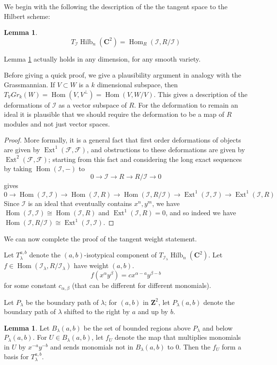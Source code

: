 \documentclass{amsart}[12pt]
\theoremstyle{definition}
\newtheorem{lemma}[dummy]{Lemma}
\newcommand{\Z}{\mathbf{Z}}
\newcommand{\C}{\mathbf{C}}
\DeclareMathOperator{\Hilb}{Hilb}
\DeclareMathOperator{\Ext}{Ext}
\DeclareMathOperator{\Hom}{Hom}
\begin{document}
We begin with the following the description of the the tangent space to the Hilbert scheme:


\begin{lemma} \label{lem:tangent-hom}
$$T_{\mathcal{I}}\Hilb_n(\C^2)=\Hom_R(\mathcal{I},R/\mathcal{I})$$
\end{lemma}

Lemma \ref{lem:tangent-hom} actually holds in any dimension, for any smooth variety.

Before giving a quick proof, we give a plausibility argument in analogy with the Grassmannian.  If $V\subset W$ is a $k$ dimensional subspace, then $T_V Gr_k(W)=\Hom(V, V^\perp)=\Hom(V, W/V)$.  This gives a description of the deformations of $\mathcal{I}$ as a vector subspace of $R$.  For the deformation to remain an ideal it is plausible that we should require the deformation to be a map of $R$ modules and not just vector spaces.

\begin{proof}
More formally, it is a general fact that first order deformations of objects are given by $\Ext^1(\mathcal{F},\mathcal{F})$, and obstructions to these deformations are given by $\Ext^2(\mathcal{F},\mathcal{F})$; starting from this fact and considering the long exact sequences by taking $\Hom(\mathcal{I}, -)$ to
$$0\to \mathcal{I}\to R\to R/\mathcal{I}\to 0$$
gives 
$$0\to\Hom(\mathcal{I},\mathcal{I})\to \Hom(\mathcal{I}, R)\to\Hom(\mathcal{I},R/\mathcal{I})\to\Ext^1(\mathcal{I}, \mathcal{I})\to\Ext^1(\mathcal{I},R)$$
Since $\mathcal{I}$ is an ideal that eventually contains $x^n, y^m$, we have $\Hom(\mathcal{I},\mathcal{I})\cong\Hom(\mathcal{I}, R)$ and $\Ext^1(\mathcal{I},R)=0$, and so indeed we have $\Hom(\mathcal{I},R/\mathcal{I})\cong\Ext^1(\mathcal{I}, \mathcal{I})$.
\end{proof}

We can now complete the proof of the tangent weight statement.


Let $T_\lambda^{a,b}$ denote the $(a,b)$-isotypical component of $T_{\mathcal{I}_\lambda}\Hilb_n(\C^2)$.  Let $f\in\Hom(\mathcal{I}_\lambda, R/\mathcal{I}_\lambda)$ have weight $(a,b)$.
$$f(x^{\alpha}y^\beta)=cx^{\alpha-a}y^{\beta-b}$$
for some constant $c_{\alpha, \beta}$ (that can be different for different monomials).  


Let $P_\lambda$ be the boundary path of $\lambda$; for $(a,b)$ in $\Z^2$, let $P_\lambda(a,b)$ denote the boundary path of $\lambda$ shifted to the right by $a$ and up by $b$.

\begin{lemma} Let $B_\lambda(a,b)$ be the set of bounded regions above $P_\lambda$ and below $P_\lambda(a,b)$.  For $U\in B_\lambda(a,b)$, let $f_U$ denote the map that multiplies monomials in $U$ by $x^{-a}y^{-b}$ and sends monomials not in $B_\lambda(a,b)$ to $0$.  Then the $f_U$ form a basis for $T_\lambda^{a,b}$.
\end{lemma}
\end{document}
